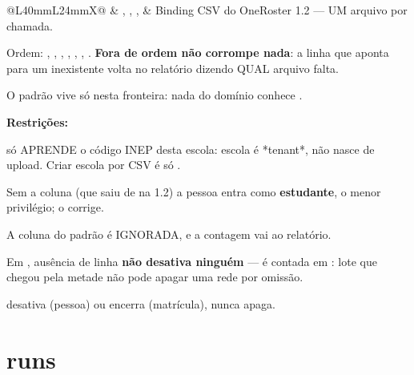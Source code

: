 \begin{tabularx}{\linewidth}{@{}L{40mm}L{24mm}X@{}}
 & , , ,  & Binding CSV do OneRoster 1.2 --- UM arquivo por chamada.\par Ordem: , , , , , , . \textbf{Fora de ordem não corrompe nada}: a linha que aponta para um  inexistente volta no relatório dizendo QUAL arquivo falta.\par O padrão vive só nesta fronteira: nada do domínio conhece .\par \textbf{Restrições:}\par \hspace*{1em}\textbullet{}  só APRENDE o código INEP desta escola: escola é *tenant*, não nasce de upload. Criar escola por CSV é só .\par \hspace*{1em}\textbullet{} Sem a coluna  (que saiu de  na 1.2) a pessoa entra como \textbf{estudante}, o menor privilégio; o  corrige.\par \hspace*{1em}\textbullet{} A coluna  do padrão é IGNORADA, e a contagem vai ao relatório.\par \hspace*{1em}\textbullet{} Em , ausência de linha \textbf{não desativa ninguém} --- é contada em : lote que chegou pela metade não pode apagar uma rede por omissão.\par \hspace*{1em}\textbullet{}  desativa (pessoa) ou encerra (matrícula), nunca apaga.\\
\bottomrule
\end{tabularx}

\section{runs}

